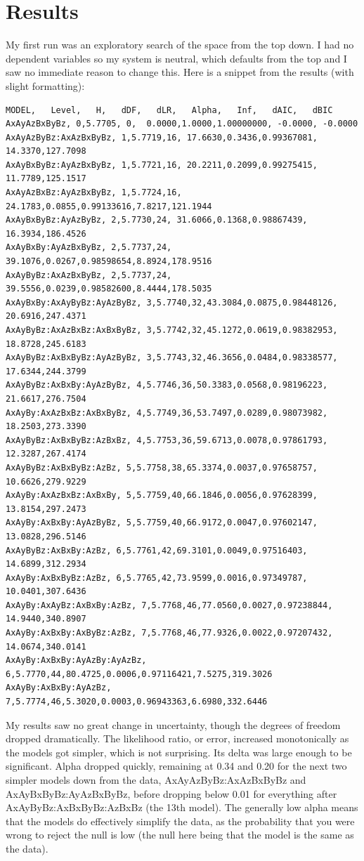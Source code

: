 \documentclass[11pt]{article}
\begin{document}
\section{Results}

My first run was an exploratory search of the space from the top down.  I had no dependent variables so my system is neutral, which defaults from the top and I saw no immediate reason to change this.  Here is a snippet from the results (with slight formatting):

\begin{verbatim}
MODEL,   Level,   H,   dDF,   dLR,   Alpha,   Inf,   dAIC,   dBIC
AxAyAzBxByBz, 0,5.7705, 0,  0.0000,1.0000,1.00000000, -0.0000, -0.0000
AxAyAzByBz:AxAzBxByBz, 1,5.7719,16, 17.6630,0.3436,0.99367081, 14.3370,127.7098
AxAyBxByBz:AyAzBxByBz, 1,5.7721,16, 20.2211,0.2099,0.99275415, 11.7789,125.1517
AxAyAzBxBz:AyAzBxByBz, 1,5.7724,16, 24.1783,0.0855,0.99133616,7.8217,121.1944
AxAyBxByBz:AyAzByBz, 2,5.7730,24, 31.6066,0.1368,0.98867439, 16.3934,186.4526
AxAyBxBy:AyAzBxByBz, 2,5.7737,24, 39.1076,0.0267,0.98598654,8.8924,178.9516
AxAyByBz:AxAzBxByBz, 2,5.7737,24, 39.5556,0.0239,0.98582600,8.4444,178.5035
AxAyBxBy:AxAyByBz:AyAzByBz, 3,5.7740,32,43.3084,0.0875,0.98448126, 20.6916,247.4371
AxAyByBz:AxAzBxBz:AxBxByBz, 3,5.7742,32,45.1272,0.0619,0.98382953, 18.8728,245.6183
AxAyByBz:AxBxByBz:AyAzByBz, 3,5.7743,32,46.3656,0.0484,0.98338577, 17.6344,244.3799
AxAyByBz:AxBxBy:AyAzByBz, 4,5.7746,36,50.3383,0.0568,0.98196223, 21.6617,276.7504
AxAyBy:AxAzBxBz:AxBxByBz, 4,5.7749,36,53.7497,0.0289,0.98073982, 18.2503,273.3390
AxAyByBz:AxBxByBz:AzBxBz, 4,5.7753,36,59.6713,0.0078,0.97861793, 12.3287,267.4174
AxAyByBz:AxBxByBz:AzBz, 5,5.7758,38,65.3374,0.0037,0.97658757, 10.6626,279.9229
AxAyBy:AxAzBxBz:AxBxBy, 5,5.7759,40,66.1846,0.0056,0.97628399, 13.8154,297.2473
AxAyBy:AxBxBy:AyAzByBz, 5,5.7759,40,66.9172,0.0047,0.97602147, 13.0828,296.5146
AxAyByBz:AxBxBy:AzBz, 6,5.7761,42,69.3101,0.0049,0.97516403, 14.6899,312.2934
AxAyBy:AxBxByBz:AzBz, 6,5.7765,42,73.9599,0.0016,0.97349787, 10.0401,307.6436
AxAyBy:AxAyBz:AxBxBy:AzBz, 7,5.7768,46,77.0560,0.0027,0.97238844, 14.9440,340.8907
AxAyBy:AxBxBy:AxByBz:AzBz, 7,5.7768,46,77.9326,0.0022,0.97207432, 14.0674,340.0141
AxAyBy:AxBxBy:AyAzBy:AyAzBz, 6,5.7770,44,80.4725,0.0006,0.97116421,7.5275,319.3026
AxAyBy:AxBxBy:AyAzBz, 7,5.7774,46,5.3020,0.0003,0.96943363,6.6980,332.6446
\end{verbatim}

My results saw no great change in uncertainty, though the degrees of freedom dropped dramatically.  The likelihood ratio, or error, increased monotonically as the models got simpler, which is not surprising.  Its delta was large enough to be significant.  Alpha dropped quickly, remaining at 0.34 and 0.20 for the next two simpler models down from the data, AxAyAzByBz:AxAzBxByBz and AxAyBxByBz:AyAzBxByBz, before dropping below 0.01 for everything after AxAyByBz:AxBxByBz:AzBxBz (the 13th model).  The generally low alpha means that the models do effectively simplify the data, as the probability that you were wrong to reject the null is low (the null here being that the model is the same as the data).  
\end{document}
